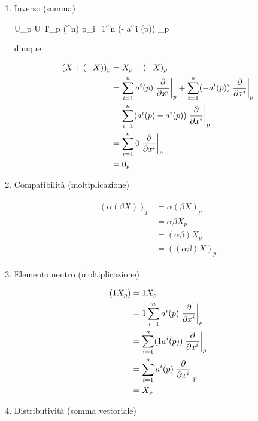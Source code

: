 {\begin{enumerate}
	\item Inverso (somma)
	
		{U}{\bigsqcup_{p \in U} T_{p} (\R^{n})}
		{p}{\sum_{i=1}^{n} (- a^{i} (p)) _{p}}
	
	dunque
	
	\begin{align}
		\begin{split}
			(X + (- X))_{p} &= X_{p} + (- X)_{p} \\
			&= \sum_{i=1}^{n} a^{i} (p) \eval{ \pdv{x^{i}} }_{p} + \sum_{i=1}^{n} (- a^{i} (p)) \eval{ \pdv{x^{i}} }_{p} \\
			&= \sum_{i=1}^{n} (a^{i} (p) - a^{i} (p)) \eval{ \pdv{x^{i}} }_{p} \\
			&= \sum_{i=1}^{n} 0 \eval{ \pdv{x^{i}} }_{p} \\
			&= 0_{p}
		\end{split}
	\end{align}
	
	\item Compatibilità (moltiplicazione)
	
	\begin{align}
		\begin{split}
			(\alpha (\beta X))_{p} &= \alpha (\beta X)_{p} \\
			&= \alpha \beta X_{p} \\
			&= (\alpha \beta) X_{p} \\
			&= ((\alpha \beta) X)_{p}
		\end{split}
	\end{align}
	
	\item Elemento neutro (moltiplicazione)
	
	\begin{align}
		\begin{split}
			(1 X_{p}) &= 1 X_{p} \\
			&= 1 \sum_{i=1}^{n} a^{i} (p) \eval{ \pdv{x^{i}} }_{p} \\
			&= \sum_{i=1}^{n} (1 a^{i} (p)) \eval{ \pdv{x^{i}} }_{p} \\
			&= \sum_{i=1}^{n} a^{i} (p) \eval{ \pdv{x^{i}} }_{p} \\
			&= X_{p}
		\end{split}
	\end{align}
	
	\item Distributività (somma vettoriale)
	

\end{enumerate}}
